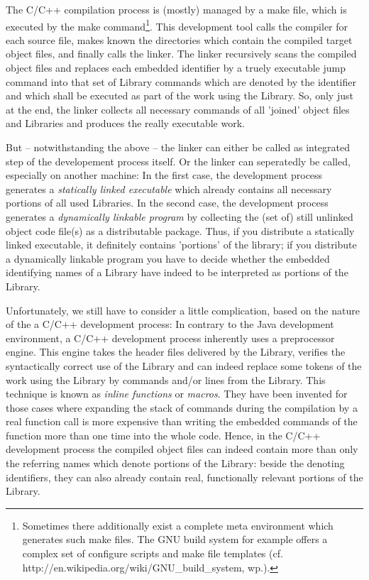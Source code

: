 The C/C++ compilation process is (mostly) managed by a make file, which is
executed by the make command\footnote{Sometimes there additionally exist a
complete meta environment which generates such make files. The GNU build system
for example offers a complex set of configure scripts and make file templates
(cf. http://en.wikipedia.org/wiki/GNU\_build\_system, wp.).}. This development
tool calls the compiler for each source file, makes known the directories which
contain the compiled target object files, and finally calls the linker.
The linker recursively scans the compiled object files and replaces each
embedded identifier by a truely executable jump command into that set of Library
commands which are denoted by the identifier and which shall be executed as part
of the work using the Library. So, only just at the end, the linker collects all
necessary commands of all 'joined' object files and Libraries and produces the
really executable work.

But -- notwithstanding the above -- the linker can either be called as
integrated step of the developement process itself. Or the linker can
seperatedly be called, especially on another machine: In the first case, the
development process generates a \emph{statically linked executable} which
already contains all necessary portions of all used Libraries. In the second
case, the development process generates a \emph{dynamically linkable program} by
collecting the (set of) still unlinked object code file(s) as a distributable
package. Thus, if you distribute a statically linked executable, it definitely
contains 'portions' of the library; if you distribute a dynamically linkable
program you have to decide whether the embedded identifying names of a Library
have indeed to be interpreted as portions of the Library.

Unfortunately, we still have to consider a little complication, based on the
nature of the a C/C++ development process: In contrary to the Java development
environment, a C/C++ development process inherently uses a preprocessor engine.
This engine takes the header files delivered by the Library, verifies the
syntactically correct use of the Library and can indeed replace some tokens of
the work using the Library by commands and/or lines from the Library. This
technique is known as \emph{inline functions} or \emph{macros}. They have been
invented for those cases where expanding the stack of commands during the
compilation by a real function call is more expensive than writing the embedded
commands of the function more than one time into the whole code. Hence, in the
C/C++ development process the compiled object files can indeed contain more than
only the referring names which denote portions of the Library: beside the
denoting identifiers, they can also already contain real, functionally relevant
portions of the Library.
 
